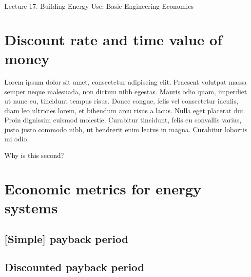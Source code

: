 \documentclass[10pt]{article}
\begin{document}
   \noindent
   \begin{center}

   \hrulefill
   
   \vspace{5pt}
   
   \vspace{0pt}
   
   {\Large \hfill  Lecture 17.  
Building Energy Use: Basic Engineering Economics}
   \vspace{5pt}
   
  
   \hrulefill
   \end{center}

{}

\section{Discount rate and time value of money}
Lorem ipsum dolor sit amet, consectetur adipiscing elit. Praesent volutpat massa semper neque malesuada, non dictum nibh egestas. Mauris odio quam, imperdiet ut nunc eu, tincidunt tempus risus. Donec congue, felis vel consectetur iaculis, diam leo ultricies lorem, et bibendum arcu risus a lacus. Nulla eget placerat dui. Proin dignissim euismod molestie. Curabitur tincidunt, felis eu convallis varius, justo justo commodo nibh, ut hendrerit enim lectus in magna. Curabitur lobortis mi odio. 

Why is this second?\cite{Goswami2007-hf}

\section{Economic metrics for energy systems}

\subsection{[Simple] payback period}

\subsection{Discounted payback period}
\end{document}
